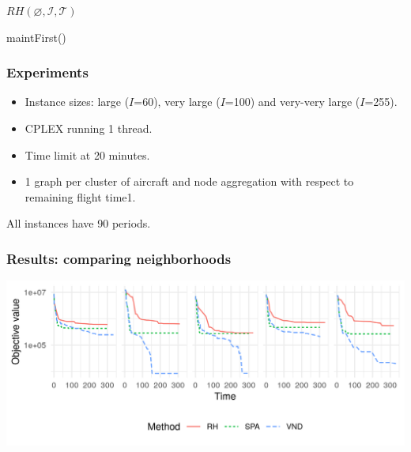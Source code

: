 \begin{frame}
  $RH(\varnothing, \mathcal{I}, \mathcal{T})$ \\

  maintFirst()

\end{frame}

\begin{frame}
\frametitle{\textbf{Experiments}}
  
  \begin{itemize}[<+->]

  \item Instance sizes: large ($I$=60), very large ($I$=100) and very-very large ($I$=255).
  \item CPLEX running 1 thread.
  \item Time limit at 20 minutes.
  \item 1 graph per cluster of aircraft and node aggregation with respect to remaining flight time1.
  \end{itemize}

  \pause

  All instances have 90 periods.
\end{frame}

\begin{frame}
\frametitle{\textbf{Results: comparing neighborhoods}}
  \includegraphics[width=\linewidth]{images/compare_neighbors.png}
\end{frame}

